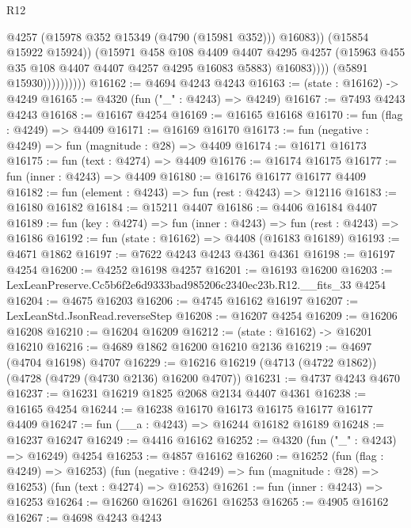 \begin{lexlean}{R12}
\begin{coremodule}
                                  @4257
                                  (@15978 @352 @15349 (@4790 (@15981 @352)))
                                  @16083))
                              (@15854 @15922 @15924))
                            (@15971
                              @458
                              @108
                              @4409
                              @4407
                              @4295
                              @4257
                              (@15963 @455 @35 @108 @4407 @4407 @4257 @4295 @16083 @5883)
                              @16083))))
                      (@5891 @15930))))))))))
@16162 := @4694 @4243 @4243
@16163 := (state : @16162) -> @4249
@16165 := @4320 (fun ("_" : @4243) => @4249)
@16167 := @7493 @4243 @4243
@16168 := @16167 @4254
@16169 := @16165 @16168
@16170 := fun (flag : @4249) => @4409
@16171 := @16169 @16170
@16173 := fun (negative : @4249) => fun (magnitude : @28) => @4409
@16174 := @16171 @16173
@16175 := fun (text : @4274) => @4409
@16176 := @16174 @16175
@16177 := fun (inner : @4243) => @4409
@16180 := @16176 @16177 @16177 @4409
@16182 := fun (element : @4243) => fun (rest : @4243) => @12116
@16183 := @16180 @16182
@16184 := @15211 @4407
@16186 := @4406 @16184 @4407
@16189 := fun (key : @4274) => fun (inner : @4243) => fun (rest : @4243) => @16186
@16192 := fun (state : @16162) => @4408 (@16183 @16189)
@16193 := @4671 @1862
@16197 := @7622 @4243 @4243 @4361 @4361
@16198 := @16197 @4254
@16200 := @4252 @16198 @4257
@16201 := @16193 @16200
@16203 := LexLeanPreserve.Cc5b6f2e6d9333bad985206c2340ec23b.R12.__fits_33 @4254
@16204 := @4675 @16203
@16206 := @4745 @16162 @16197
@16207 := LexLeanStd.JsonRead.reverseStep
@16208 := @16207 @4254
@16209 := @16206 @16208
@16210 := @16204 @16209
@16212 := (state : @16162) -> @16201 @16210
@16216 := @4689 @1862 @16200 @16210 @2136
@16219 := @4697 (@4704 @16198) @4707
@16229 := @16216 @16219 (@4713 (@4722 @1862)) (@4728 (@4729 (@4730 @2136) @16200 @4707))
@16231 := @4737 @4243 @4670
@16237 := @16231 @16219 @1825 @2068 @2134 @4407 @4361
@16238 := @16165 @4254
@16244 := @16238 @16170 @16173 @16175 @16177 @16177 @4409
@16247 := fun (__a : @4243) => @16244 @16182 @16189
@16248 := @16237 @16247
@16249 := @4416 @16162
@16252 := @4320 (fun ("_" : @4243) => @16249) @4254
@16253 := @4857 @16162
@16260 := @16252
    (fun (flag : @4249) => @16253)
    (fun (negative : @4249) => fun (magnitude : @28) => @16253)
    (fun (text : @4274) => @16253)
@16261 := fun (inner : @4243) => @16253
@16264 := @16260 @16261 @16261 @16253
@16265 := @4905 @16162
@16267 := @4698 @4243 @4243

\end{coremodule}
\end{lexlean}
